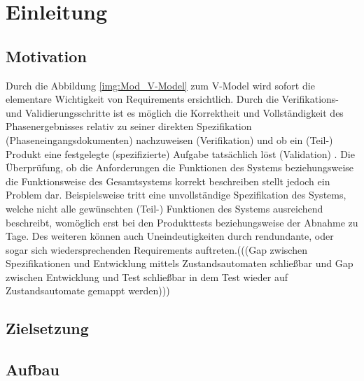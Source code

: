 
\chapter{Einleitung}
\label{chap:Einleitung}


\section{Motivation}
\label{sec:Motivation}
Durch die Abbildung \ref{img:Mod_V-Model} zum V-Model wird sofort die elementare Wichtigkeit von Requirements ersichtlich. Durch die Verifikations- und Validierungsschritte ist es möglich die Korrektheit und Vollständigkeit des Phasenergebnisses relativ zu seiner direkten Spezifikation (Phaseneingangsdokumenten) nachzuweisen (Verifikation) \cite{SL05} und ob ein (Teil-) Produkt eine festgelegte (spezifizierte) Aufgabe tatsächlich löst (Validation) \cite{SL05}. Die Überprüfung, ob die Anforderungen die Funktionen des Systems beziehungsweise die Funktionsweise des Gesamtsystems korrekt beschreiben stellt jedoch ein Problem dar. Beispielsweise tritt eine unvollständige Spezifikation des Systems, welche nicht alle gewünschten (Teil-) Funktionen des Systems ausreichend beschreibt, womöglich erst bei den Produkttests beziehungsweise der Abnahme zu Tage.  Des weiteren können auch Uneindeutigkeiten durch rendundante, oder sogar sich wiedersprechenden Requirements auftreten.(((Gap zwischen Spezifikationen und Entwicklung mittels Zustandsautomaten schließbar und Gap zwischen Entwicklung und Test schließbar in dem Test wieder auf Zustandsautomate gemappt werden)))\\
\section{Zielsetzung}
\label{sec:Ziel}


\section{Aufbau}
\label{sec:Aufbau}

